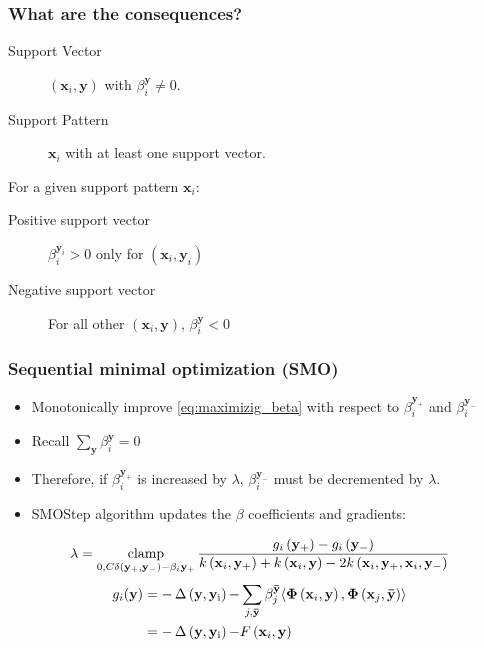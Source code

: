 \begin{frame}
    \frametitle{What are the consequences?}
    \begin{description}
        \item [Support Vector] \(\left(\mathbf{x}_i, \mathbf{y}\right)\) with \(\beta_i^\mathbf{y} \ne 0\).
        \item [Support Pattern] \(\mathbf{x}_i\) with at least one support vector.
    \end{description}

    For a given support pattern \(\mathbf{x}_i\):
    \begin{description}
        \item [Positive support vector] \(\beta_i^{\mathbf{y}_i} > 0\) only for \(\left(\mathbf{x}_i, \mathbf{y}_i\right)\)
        \item [Negative support vector] For all other \(\left(\mathbf{x}_i, \mathbf{y}\right)\), \(\beta_i^\mathbf{y} < 0\)
    \end{description}
\end{frame}

\begin{frame}
    \frametitle{Sequential minimal optimization (SMO)}
    \begin{itemize}
        \item Monotonically improve \eqref{eq:maximizig_beta} with respect to
            \(\beta_i^{\mathbf{y}_+}\) and \(\beta_i^{\mathbf{y}_-}\) 
        \item Recall \( \sum_\mathbf{y} \beta_i^\mathbf{y} = 0 \)
        \item Therefore, if \( \beta_i^{\mathbf{y}_+} \) is increased by \(\lambda\),
            \( \beta_i^{\mathbf{y}_-} \) must be decremented by \(\lambda\).
        \item SMOStep algorithm updates the \(\beta\) coefficients and gradients:
    \end{itemize}
    \begin{equation}
        \lambda = \operatorname*{clamp}_{0, C\delta\left(\mathbf{y}_+, \mathbf{y}_-\right) - \beta_i{\mathbf{y}_+}}
        \frac{g_i\left(\mathbf{y}_+\right)-g_i\left(\mathbf{y}_-\right)}
             {k\left(\mathbf{x}_i, \mathbf{y}_+\right) + k\left(\mathbf{x}_i, \mathbf{y}\right)
             -2k\left(\mathbf{x}_i, \mathbf{y}_+, \mathbf{x}_i, \mathbf{y}_-\right)}
    \end{equation}
    \begin{equation} \label{eq:gradient}
        \begin{aligned}
            g_i(\mathbf{y}) &= -\operatorname{\Delta \left( \mathbf{y}, \mathbf{y}_i \right)} - \sum_{j, \mathbf{\bar{y}}} \beta_j^\mathbf{\bar{y}}
            \langle \mathbf{\Phi}\left(\mathbf{x}_i, \mathbf{y}\right), \mathbf{\Phi}\left(\mathbf{x}_j,
            \mathbf{\bar{y}}\right) \rangle \\
            &= -\operatorname{\Delta \left( \mathbf{y}, \mathbf{y}_i \right)} - F\left(\mathbf{x}_i, \mathbf{y}\right)
        \end{aligned}
    \end{equation}
\end{frame}

